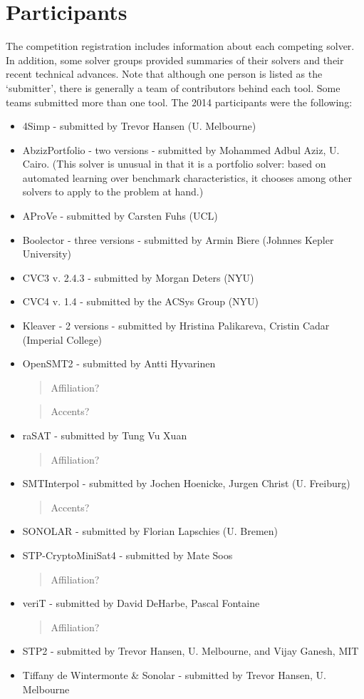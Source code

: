 \documentclass[twosize,11pt]{article}
\newcommand{\comment}[2]{\begin{quote}\sc #1\marginpar{\textcolor{red}{$\ast^{\mbox{#2}}$}}\end{quote}}
\newcommand{\tjark}[1]{\comment{#1}{TW}}
\newcommand{\tjarkx}[1]{\tjark{#1}}
\begin{document}
\section{Participants}
\label{sec:participants}

The competition registration includes information about each competing solver. In addition, some solver groups provided summaries of their solvers and their recent technical advances.
 Note that although one person is listed as the `submitter', there is generally a team of contributors behind each tool. Some teams submitted more than one tool. The 2014 participants were the following:
\begin{itemize}
\item 4Simp - submitted by Trevor Hansen (U. Melbourne)
\item AbzizPortfolio - two versions - submitted by Mohammed Adbul Aziz, U. Cairo. (This solver is unusual in that it is a portfolio solver: based on automated learning over benchmark characteristics, it chooses among other solvers to apply to the problem at hand.)
\item AProVe - submitted by Carsten Fuhs (UCL)
\item Boolector - three versions - submitted by Armin Biere (Johnnes Kepler University)
\item CVC3 v. 2.4.3 - submitted by Morgan Deters (NYU)
\item CVC4 v. 1.4 - submitted by the ACSys Group (NYU)
\item Kleaver - 2 versions - submitted by Hristina Palikareva, Cristin Cadar (Imperial College)
\item OpenSMT2 - submitted by Antti Hyvarinen \tjarkx{Affiliation?} \tjarkx{Accents?}
\item raSAT - submitted by Tung Vu Xuan \tjarkx{Affiliation?}
\item SMTInterpol - submitted by Jochen Hoenicke, Jurgen Christ (U. Freiburg) \tjarkx{Accents?}
\item SONOLAR - submitted by Florian Lapschies (U. Bremen)
\item STP-CryptoMiniSat4 - submitted by Mate Soos \tjarkx{Affiliation?}
\item veriT - submitted by David DeHarbe, Pascal Fontaine \tjarkx{Affiliation?}
\item STP2 - submitted by Trevor Hansen, U. Melbourne, and Vijay Ganesh, MIT
\item Tiffany de Wintermonte \& Sonolar - submitted by Trevor Hansen, U. Melbourne
\end{itemize}
\end{document}
